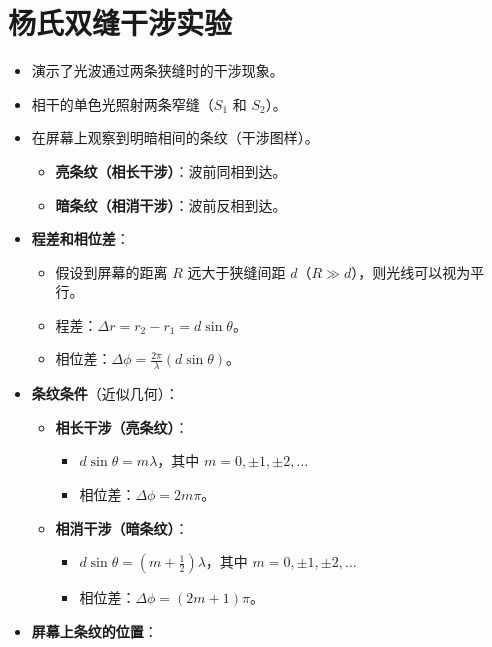 \documentclass[UTF8]{ctexart}
\begin{document}
\section{杨氏双缝干涉实验}
\begin{itemize}
    \item 演示了光波通过两条狭缝时的干涉现象。
    \item 相干的单色光照射两条窄缝（$S_1$ 和 $S_2$）。
    \item 在屏幕上观察到明暗相间的条纹（干涉图样）。
        \begin{itemize}
            \item \textbf{亮条纹（相长干涉）}：波前同相到达。
            \item \textbf{暗条纹（相消干涉）}：波前反相到达。
        \end{itemize}
    \item \textbf{程差和相位差}：
        \begin{itemize}
            \item 假设到屏幕的距离 $R$ 远大于狭缝间距 $d$（$R \gg d$），则光线可以视为平行。
            \item 程差：$\Delta r = r_2 - r_1 = d \sin\theta$。
            \item 相位差：$\Delta\phi = \frac{2\pi}{\lambda} (d \sin\theta)$。
        \end{itemize}
    \item \textbf{条纹条件}（近似几何）：
        \begin{itemize}
            \item \textbf{相长干涉（亮条纹）}：
                \begin{itemize}
                    \item $d \sin\theta = m\lambda$，其中 $m = 0, \pm1, \pm2, \dots$
                    \item 相位差：$\Delta\phi = 2m\pi$。
                \end{itemize}
            \item \textbf{相消干涉（暗条纹）}：
                \begin{itemize}
                    \item $d \sin\theta = (m + \frac{1}{2})\lambda$，其中 $m = 0, \pm1, \pm2, \dots$
                    \item 相位差：$\Delta\phi = (2m+1)\pi$。
                \end{itemize}
        \end{itemize}
    \item \textbf{屏幕上条纹的位置}：

\end{itemize}
\end{document}
